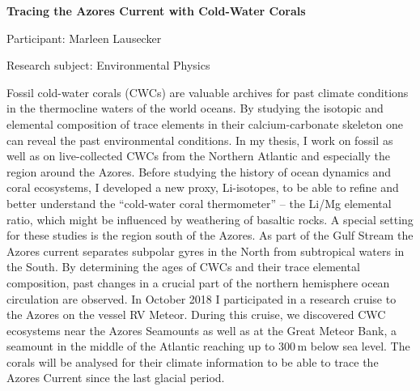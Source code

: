 \begin{minipage}[t]{1.0\textwidth}

\begin{center}

{{\large\bfseries Tracing the Azores Current with Cold-Water Corals}\par}

\end{center}

{\noindent Participant: Marleen Lausecker\par} 

{\noindent Research subject: Environmental Physics\par}\medskip

\noindent Fossil cold-water corals (CWCs) are valuable archives for past climate conditions in the thermocline waters of the world oceans. By studying the isotopic and elemental composition of trace elements in their calcium-carbonate skeleton one can reveal the past environmental conditions. 
In my thesis, I work on fossil as well as on live-collected CWCs from the Northern Atlantic and especially the region around the Azores. Before studying the history of ocean dynamics and coral ecosystems, I developed a new proxy, Li-isotopes, to be able to refine and better understand the ``cold-water coral thermometer'' – the Li/Mg elemental ratio, which might be influenced by weathering of basaltic rocks. 
A special setting for these studies is the region south of the Azores. As part of the Gulf Stream the Azores current separates subpolar gyres in the North from subtropical waters in the South. By determining the ages of CWCs and their trace elemental composition, past changes in a crucial part of the northern hemisphere ocean circulation are observed. In October 2018 I participated in a research cruise to the Azores on the vessel RV Meteor. During this cruise, we discovered CWC ecosystems near the Azores Seamounts as well as at the Great Meteor Bank, a seamount in the middle of the Atlantic reaching up to 300\,m below sea level. The corals will be analysed for their climate information to be able to trace the Azores Current since the last glacial period.\par\end{minipage}

\hfill 


